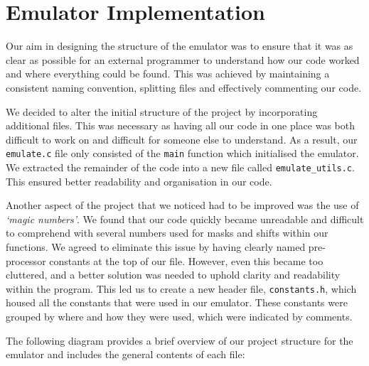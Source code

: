 \documentclass[10pt]{article}
\begin{document}
\section*{Emulator Implementation}
Our aim in designing the structure of the emulator was to ensure that it was as clear as possible for an external
programmer to understand how our code worked and where everything could be found. This was achieved by
maintaining a consistent naming convention, splitting files and effectively commenting our code.


We decided to alter the initial structure of the project by incorporating additional files. This was necessary as
having all our code in one place was both difficult to work on and difficult for someone else to understand. As
a result, our {\tt emulate.c} file only consisted of the {\tt main} function which initialised the emulator. We extracted the
remainder of the code into a new file called {\tt emulate\_utils.c}. This ensured better readability and organisation in our code.
 

Another aspect of the project that we noticed had to be improved was the use of \textsl{‘magic numbers’}. We found
that our code quickly became unreadable and difficult to comprehend with several numbers used for masks
and shifts within our functions. We agreed to eliminate this issue by having clearly named pre-processor
constants at the top of our file. However, even this became too cluttered, and a better solution was needed to
uphold clarity and readability within the program. This led us to create a new header file, {\tt constants.h}, which
housed all the constants that were used in our emulator. These constants were grouped by where and how
they were used, which were indicated by comments.


The following diagram provides a brief overview of our project structure for the emulator and includes the
general contents of each file:

\vspace{0.5cm}
\end{document}
